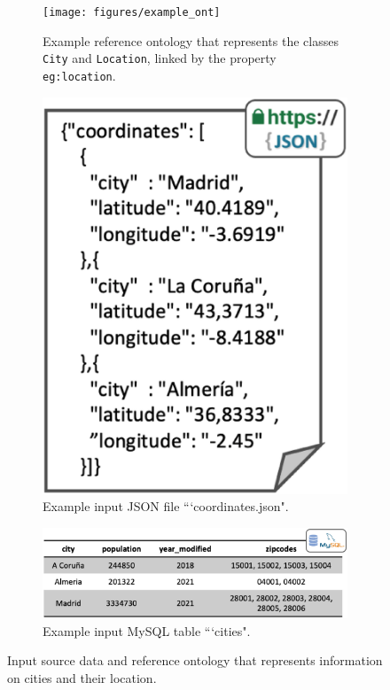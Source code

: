 \begin{figure}[b!]
    \centering
    \begin{subfigure}[b]{0.45\linewidth}
        \centering
    	\texttt{[image: figures/example\_ont]}
    	\caption{Example reference ontology that represents the classes \texttt{City} and \texttt{Location}, linked by the property \texttt{eg:location}.}
    	\label{fig:chp4_ex_onto}
    \end{subfigure}
    \begin{subfigure}[b]{0.28\linewidth}
        \centering
    	\includegraphics[width=1\linewidth]{figures/example_json}
    	\caption{Example input JSON file ```coordinates.json".}
    	\label{fig:chp4_ex_json}
    \end{subfigure}
    \begin{subfigure}[b]{0.7\linewidth}
        \centering
    	\includegraphics[width=1\linewidth]{figures/example_rdb}
    	\caption{Example input MySQL table ```cities".}
    	\label{fig:chp4_ex_rdb}
    \end{subfigure}
    \caption{Input source data and reference ontology that represents information on cities and their location.}
    \label{fig:chp4_ex_input}
\end{figure}



